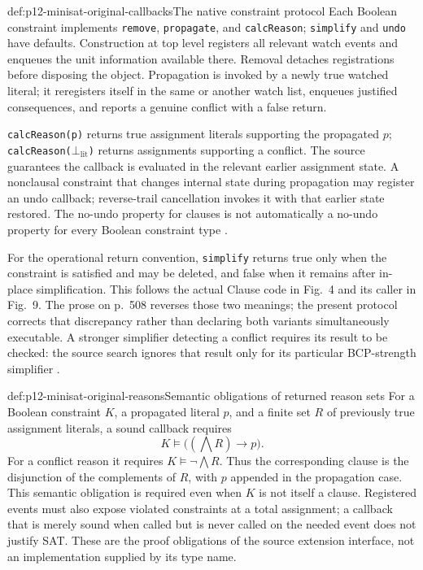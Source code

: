 \begin{hbmethod}{def:p12-minisat-original-callbacks}{The native constraint protocol}
Each Boolean constraint implements \texttt{remove}, \texttt{propagate}, and
\texttt{calcReason}; \texttt{simplify} and \texttt{undo} have defaults.
Construction at top level registers all relevant watch events and enqueues
the unit information available there.  Removal detaches registrations before
disposing the object.  Propagation is invoked by a newly true watched literal;
it reregisters itself in the same or another watch list, enqueues justified
consequences, and reports a genuine conflict with a false return.

\texttt{calcReason(p)} returns true assignment literals supporting the
propagated \(p\); \texttt{calcReason(}\(\bot_{\mathrm{lit}}\)\texttt{)} returns assignments
supporting a conflict.  The source guarantees the callback is evaluated in
the relevant earlier assignment state.  A nonclausal constraint that changes
internal state during propagation may register an undo callback; reverse-trail
cancellation invokes it with that earlier state restored.  The no-undo
property for clauses is not automatically a no-undo property for every
Boolean constraint type \cite[Sec.~4.2]{EenSorensson2003}.

For the operational return convention, \texttt{simplify} returns true only
when the constraint is satisfied and may be deleted, and false when it remains
after in-place simplification.  This follows the actual Clause code in Fig.~4
and its caller in Fig.~9.  The prose on p.~508 reverses those two meanings;
the present protocol corrects that discrepancy rather than declaring both
variants simultaneously executable.  A stronger simplifier detecting a
conflict requires its result to be checked: the source search ignores that
result only for its particular BCP-strength simplifier
\cite[pp.~508, 510, 515, 517]{EenSorensson2003}.
\end{hbmethod}

\begin{hbdefinition}{def:p12-minisat-original-reasons}{Semantic obligations of returned reason sets}
For a Boolean constraint \(K\), a propagated literal \(p\), and a finite
set \(R\) of previously true assignment literals, a sound callback requires
\[
 K\models\bigl((\bigwedge R)\to p\bigr).
\]
For a conflict reason it requires \(K\models\neg\bigwedge R\).
Thus the corresponding clause is the disjunction of the complements of
\(R\), with \(p\) appended in the propagation case.  This semantic
obligation is required even when \(K\) is not itself a clause.  Registered
events must also expose violated constraints at a total assignment; a
callback that is merely sound when called but is never called on the needed
event does not justify SAT.  These are the proof obligations of the source
extension interface, not an implementation supplied by its type name.
\end{hbdefinition}

